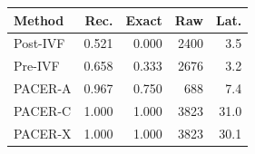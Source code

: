\begin{tabular}{lrrrr}
\toprule
Method & Rec. & Exact & Raw & Lat.\\
\midrule
Post-IVF & 0.521 & 0.000 & 2400 & 3.5\\
Pre-IVF & 0.658 & 0.333 & 2676 & 3.2\\
PACER-A & 0.967 & 0.750 & 688 & 7.4\\
PACER-C & 1.000 & 1.000 & 3823 & 31.0\\
PACER-X & 1.000 & 1.000 & 3823 & 30.1\\
\bottomrule
\end{tabular}